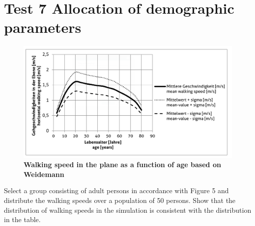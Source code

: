 \section*{Test 7 Allocation of demographic parameters}

\begin{figure}[h]
	\centering
	\includegraphics[scale=0.38]{test_description/Walking_speed_test_7.png}
	\caption{\footnotesize \textbf{Walking speed in the plane as a function of age based on Weidemann}}
\end{figure}

\noindent
Select a group consisting of adult persons in accordance with Figure 5 and distribute the walking speeds over a population of 50 persons. Show that the distribution of walking speeds in the simulation is consistent with the distribution in the table.

